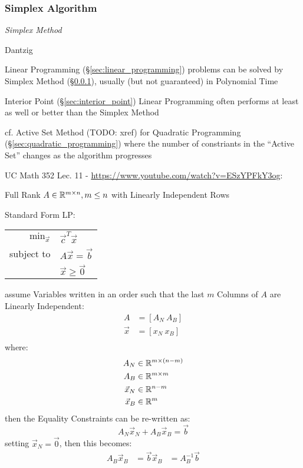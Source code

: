 \subsubsection{Simplex Algorithm}\label{sec:simplex_algorithm}

\emph{Simplex Method}

Dantzig

Linear Programming (\S\ref{sec:linear_programming}) problems can be solved by
Simplex Method (\S\ref{sec:simplex_algorithm}), usually (but not guaranteed) in
Polynomial Time

\fist Interior Point (\S\ref{sec:interior_point}) Linear Programming often
performs at least as well or better than the Simplex Method

cf. Active Set Method (TODO: xref) for Quadratic Programming
(\S\ref{sec:quadratic_programming}) where the number of constriants in the
``Active Set'' changes as the algorithm progresses

UC Math 352 Lec. 11 - \url{https://www.youtube.com/watch?v=ESzYPFkY3og}:

Full Rank $A \in \mathbb{R}^{m \times n}, m \leq n$ with Linearly Independent Rows

Standard Form LP:

\begin{tabular}{r l}
  $\mathrm{min}_{\vec{x}}$ & $\vec{c}^T\vec{x}$     \\
  subject to               & $A\vec{x} = \vec{b}$   \\
                           & $\vec{x} \geq \vec{0}$ \\
\end{tabular}

assume Variables written in an order such that the last $m$ Columns of $A$ are
Linearly Independent:
\begin{align*}
  A       & = [A_N \ A_B] \\
  \vec{x} & = [x_N \ x_B] \\
\end{align*}
where:
\begin{align*}
  A_N       & \in \mathbb{R}^{m \times (n - m)} \\
  A_B       & \in \mathbb{R}^{m \times m} \\
  \vec{x}_N & \in \mathbb{R}^{n-m} \\
  \vec{x}_B & \in \mathbb{R}^m \\
\end{align*}
then the Equality Constraints can be re-written as:
\[
  A_N\vec{x}_N + A_B\vec{x}_B = \vec{b}
\]
setting $\vec{x}_N = \vec{0}$, then this becomes:
\begin{align*}
  A_B\vec{x}_B & = \vec{b}
  \vec{x}_B    & = A_B^{-1}\vec{b}
\end{align*}

